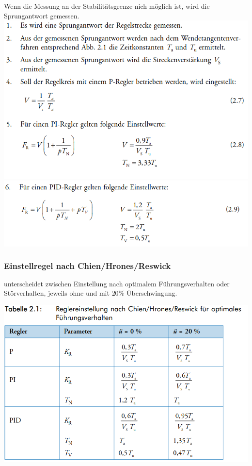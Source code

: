 Wenn die Messung an der Stabilitätsgrenze nich möglich ist, wird die Sprungantwort gemessen. \\
\includegraphics[scale= 0.5]{themen/pict/variante2.png}\\
\includegraphics[scale= 0.5]{themen/pict/variante2-2.png}

\subsubsection{Einstellregel nach Chien/Hrones/Reswick}
unterscheidet zwischen Einstellung nach optimalem Führungsverhalten oder Störverhalten, jeweils ohne und mit $20\%$ Überschwingung.

\includegraphics[scale= 0.5]{themen/pict/chien-fuehrung.png}\\

